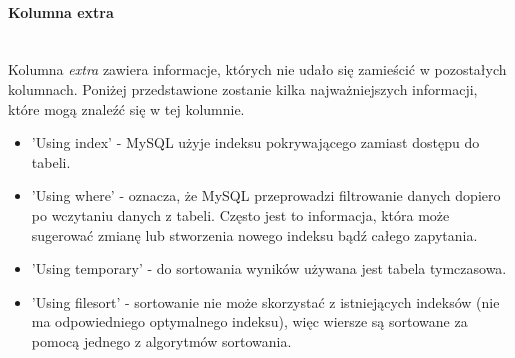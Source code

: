 \paragraph{Kolumna extra}\leavevmode\\
Kolumna \textit{extra} zawiera informacje, których nie udało się zamieścić w pozostałych kolumnach. Poniżej przedstawione zostanie kilka najważniejszych informacji, które mogą znaleźć się w tej kolumnie.

\begin{itemize}
	\item 'Using index' - MySQL użyje indeksu pokrywającego zamiast dostępu do tabeli.
	\item 'Using where' - oznacza, że MySQL przeprowadzi filtrowanie danych dopiero po wczytaniu danych z tabeli. Często jest to informacja, która może sugerować zmianę lub stworzenia nowego indeksu bądź całego zapytania.
	\item 'Using temporary' - do sortowania wyników używana jest tabela tymczasowa.
	\item 'Using filesort' - sortowanie nie może skorzystać z istniejących indeksów (nie ma odpowiedniego optymalnego indeksu), więc wiersze są sortowane za pomocą jednego z algorytmów sortowania.
	
\end{itemize}